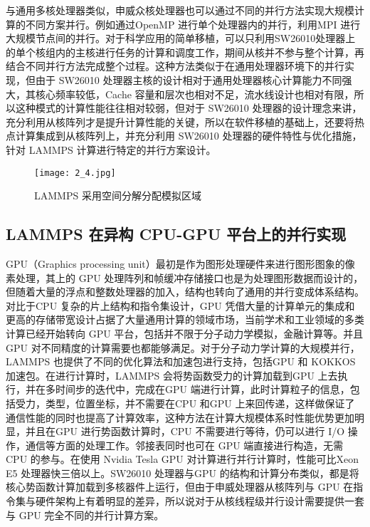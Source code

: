 与通用多核处理器类似，申威众核处理器也可以通过不同的并行方法实现大规模计算的不同方案并行。例如通过OpenMP 进行单个处理器内的并行，利用MPI 进行大规模节点间的并行。对于科学应用的简单移植，可以只利用SW26010处理器上的单个核组内的主核进行任务的计算和调度工作，期间从核并不参与整个计算，再结合不同并行方法完成整个过程。这种方法类似于在通用处理器环境下的并行实现，但由于 SW26010 处理器主核的设计相对于通用处理器核心计算能力不同强大，其核心频率较低，Cache 容量和层次也相对不足，流水线设计也相对有限，所以这种模式的计算性能往往相对较弱，但对于 SW26010 处理器的设计理念来讲，充分利用从核阵列才是提升计算性能的关键，所以在软件移植的基础上，还要将热点计算集成到从核阵列上，并充分利用 SW26010 处理器的硬件特性与优化措施，针对 LAMMPS 计算进行特定的并行方案设计。

 \begin{figure}[h]
  \centering
  \texttt{[image: 2\_4.jpg]}
  \caption{LAMMPS 采用空间分解分配模拟区域}
\end{figure}

\subsection{LAMMPS 在异构 CPU-GPU 平台上的并行实现}
GPU（Graphics processing unit）最初是作为图形处理硬件来进行图形图象的像素处理，其上的 GPU 处理阵列和帧缓冲存储接口也是为处理图形数据而设计的，但随着大量的浮点和整数处理器的加入，结构也转向了通用的并行变成体系结构。对比于CPU 复杂的片上结构和指令集设计，GPU 凭借大量的计算单元的集成和更高的存储带宽设计占据了大量通用计算的领域市场，当前学术和工业领域的多类计算已经开始转向 GPU 平台，包括并不限于分子动力学模拟，金融计算等。并且 GPU 对不同精度的计算需要也都能够满足。对于分子动力学计算的大规模并行，LAMMPS 也提供了不同的优化算法和加速包进行支持，包括GPU 和 KOKKOS 加速包。在进行计算时，LAMMPS 会将势函数受力的计算加载到GPU 上去执行，并在多时间步的迭代中，完成在GPU 端进行计算，此时计算粒子的信息，包括受力，类型，位置坐标，并不需要在CPU 和GPU 上来回传递，这样做保证了通信性能的同时也提高了计算效率，这种方法在计算大规模体系时性能优势更加明显，并且在GPU 进行势函数计算时，CPU 不需要进行等待，仍可以进行 I/O 操作，通信等方面的处理工作。邻接表同时也可在 GPU 端直接进行构造，无需 CPU 的参与。在使用 Nvidia Tesla GPU 对计算进行并行计算时，性能可比Xeon E5 处理器快三倍以上。SW26010 处理器与GPU 的结构和计算分布类似，都是将核心势函数计算加载到多核器件上运行，但由于申威处理器从核阵列与 GPU 在指令集与硬件架构上有着明显的差异，所以说对于从核线程级并行设计需要提供一套与 GPU 完全不同的并行计算方案。

